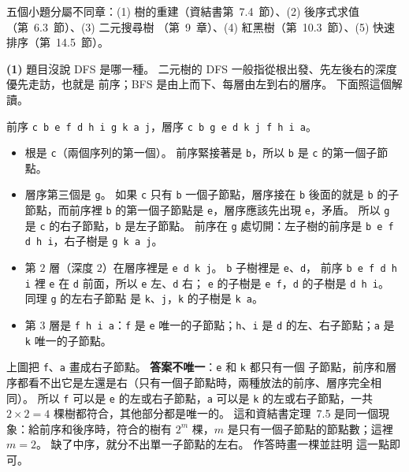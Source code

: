 \begin{pastsoln}
五個小題分屬不同章：(1) 樹的重建（資結書第~7.4~節）、(2) 後序式求值（第~6.3~節）、(3) 二元搜尋樹
（第~9~章）、(4) 紅黑樹（第~10.3~節）、(5) 快速排序（第~14.5~節）。

\textbf{(1)} 題目沒說 DFS 是哪一種。 二元樹的 DFS 一般指從根出發、先左後右的深度優先走訪，也就是
前序；BFS 是由上而下、每層由左到右的層序。 下面照這個解讀。

前序 \texttt{c b e f d h i g k a j}，層序 \texttt{c b g e d k j f h i a}。
\begin{itemize}
\item 根是 \texttt{c}（兩個序列的第一個）。 前序緊接著是 \texttt{b}，所以 \texttt{b} 是
\texttt{c} 的第一個子節點。
\item 層序第三個是 \texttt{g}。 如果 \texttt{c} 只有 \texttt{b} 一個子節點，層序接在 \texttt{b}
後面的就是 \texttt{b} 的子節點，而前序裡 \texttt{b} 的第一個子節點是 \texttt{e}，層序應該先出現
\texttt{e}，矛盾。 所以 \texttt{g} 是 \texttt{c} 的右子節點，\texttt{b} 是左子節點。 前序在
\texttt{g} 處切開：左子樹的前序是 \texttt{b e f d h i}，右子樹是 \texttt{g k a j}。
\item 第 $2$ 層（深度 $2$）在層序裡是 \texttt{e d k j}。 \texttt{b} 子樹裡是 \texttt{e}、\texttt{d}，
前序 \texttt{b e f d h i} 裡 \texttt{e} 在 \texttt{d} 前面，所以 \texttt{e} 左、\texttt{d} 右；
\texttt{e} 的子樹是 \texttt{e f}，\texttt{d} 的子樹是 \texttt{d h i}。 同理 \texttt{g} 的左右子節點
是 \texttt{k}、\texttt{j}，\texttt{k} 的子樹是 \texttt{k a}。
\item 第 $3$ 層是 \texttt{f h i a}：\texttt{f} 是 \texttt{e} 唯一的子節點；\texttt{h}、\texttt{i}
是 \texttt{d} 的左、右子節點；\texttt{a} 是 \texttt{k} 唯一的子節點。
\end{itemize}

\begin{center}
\end{center}
上圖把 \texttt{f}、\texttt{a} 畫成右子節點。 \textbf{答案不唯一}：\texttt{e} 和 \texttt{k} 都只有一個
子節點，前序和層序都看不出它是左還是右（只有一個子節點時，兩種放法的前序、層序完全相同）。 所以
\texttt{f} 可以是 \texttt{e} 的左或右子節點，\texttt{a} 可以是 \texttt{k} 的左或右子節點，一共
$2 \times 2 = 4$ 棵樹都符合，其他部分都是唯一的。 這和資結書定理~7.5 是同一個現象：給前序和後序時，符合的樹有
$2^m$ 棵，$m$ 是只有一個子節點的節點數；這裡 $m = 2$。 缺了中序，就分不出單一子節點的左右。 作答時畫一棵並註明
這一點即可。


\end{pastsoln}

